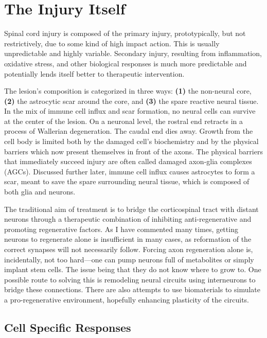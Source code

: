 \documentclass[12pt]{report}
\begin{document}
\chapter{The Injury Itself}

Spinal cord injury is composed of the primary injury, prototypically, but not restrictively, due to some kind of high impact action. This is usually unpredictable and highly variable. Secondary injury, resulting from inflammation, oxidative stress, and other biological responses is much more predictable and potentially lends itself better to therapeutic intervention.\newline

The lesion's composition is categorized in three ways: \textbf{(1)} the non-neural core, \textbf{(2)} the astrocytic scar around the core, and \textbf{(3)} the spare reactive neural tissue. In the mix of immune cell influx and scar formation, no neural cells can survive at the center of the lesion. On a neuronal level, the rostral end retracts in a process of Wallerian degeneration. The caudal end dies away. Growth from the cell body is limited both by the damaged cell's biochemistry and by the physical barriers which now present themselves in front of the axons. The physical barriers that immediately succeed injury are often called damaged axon-glia complexes (AGCs). Discussed further later, immune cell influx causes astrocytes to form a scar, meant to save the spare surrounding neural tissue, which is composed of both glia and neurons.\newline

The traditional aim of treatment is to bridge the corticospinal tract with distant neurons through a therapeutic combination of inhibiting anti-regenerative and promoting regenerative factors. As I have commented many times, getting neurons to regenerate alone is insufficient in many cases, as reformation of the correct synapses will not necessarily follow. Forcing axon regeneration alone is, incidentally, not too hard---one can pump neurons full of metabolites or simply implant stem cells. The issue being that they do not know where to grow to. One possible route to solving this is remodeling neural circuits using interneurons to bridge these connections. There are also attempts to use biomaterials to simulate a pro-regenerative environment, hopefully enhancing plasticity of the circuits.\newline


\section{Cell Specific Responses}
\end{document}
